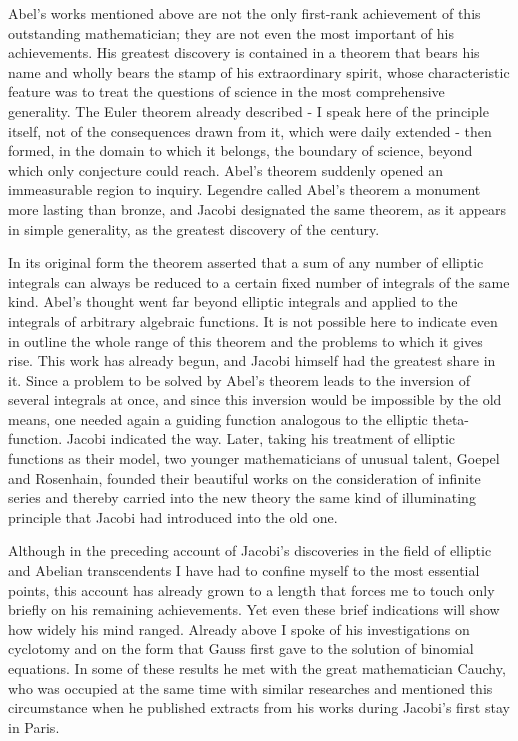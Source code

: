 \documentclass[11pt]{article}
\begin{document}
Abel's works mentioned above are not the only first-rank achievement of this outstanding mathematician; they are not even the most important of his achievements. His greatest discovery is contained in a theorem that bears his name and wholly bears the stamp of his extraordinary spirit, whose characteristic feature was to treat the questions of science in the most comprehensive generality. The Euler theorem already described - I speak here of the principle itself, not of the consequences drawn from it, which were daily extended - then formed, in the domain to which it belongs, the boundary of science, beyond which only conjecture could reach. Abel's theorem suddenly opened an immeasurable region to inquiry. Legendre called Abel's theorem a monument more lasting than bronze, and Jacobi designated the same theorem, as it appears in simple generality, as the greatest discovery of the century.

In its original form the theorem asserted that a sum of any number of elliptic integrals can always be reduced to a certain fixed number of integrals of the same kind. Abel's thought went far beyond elliptic integrals and applied to the integrals of arbitrary algebraic functions. It is not possible here to indicate even in outline the whole range of this theorem and the problems to which it gives rise. This work has already begun, and Jacobi himself had the greatest share in it. Since a problem to be solved by Abel's theorem leads to the inversion of several integrals at once, and since this inversion would be impossible by the old means, one needed again a guiding function analogous to the elliptic theta-function. Jacobi indicated the way. Later, taking his treatment of elliptic functions as their model, two younger mathematicians of unusual talent, Goepel and Rosenhain, founded their beautiful works on the consideration of infinite series and thereby carried into the new theory the same kind of illuminating principle that Jacobi had introduced into the old one.

Although in the preceding account of Jacobi's discoveries in the field of elliptic and Abelian transcendents I have had to confine myself to the most essential points, this account has already grown to a length that forces me to touch only briefly on his remaining achievements. Yet even these brief indications will show how widely his mind ranged. Already above I spoke of his investigations on cyclotomy and on the form that Gauss first gave to the solution of binomial equations. In some of these results he met with the great mathematician Cauchy, who was occupied at the same time with similar researches and mentioned this circumstance when he published extracts from his works during Jacobi's first stay in Paris.
\end{document}
